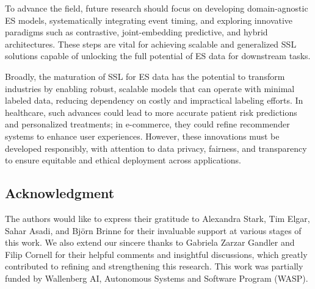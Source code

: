 \documentclass[twoside,11pt]{article}
\begin{document}
To advance the field, future research should focus on developing domain-agnostic ES models, systematically integrating event timing, and exploring innovative paradigms such as contrastive, joint-embedding predictive, and hybrid architectures. These steps are vital for achieving scalable and generalized SSL solutions capable of unlocking the full potential of ES data for downstream tasks.

Broadly, the maturation of SSL for ES data has the potential to transform industries by enabling robust, scalable models that can operate with minimal labeled data, reducing dependency on costly and impractical labeling efforts. In healthcare, such advances could lead to more accurate patient risk predictions and personalized treatments; in e-commerce, they could refine recommender systems to enhance user experiences. However, these innovations must be developed responsibly, with attention to data privacy, fairness, and transparency to ensure equitable and ethical deployment across applications.

\subsection*{Acknowledgment}
The authors would like to express their gratitude to Alexandra Stark, Tim Elgar, Sahar Asadi, and Bj\"orn Brinne for their invaluable support at various stages of this work. We also extend our sincere thanks to Gabriela Zarzar Gandler and Filip Cornell for their helpful comments and insightful discussions, which greatly contributed to refining and strengthening this research. This work was partially funded by Wallenberg AI, Autonomous Systems and Software Program (WASP).




\newpage


\end{document}
